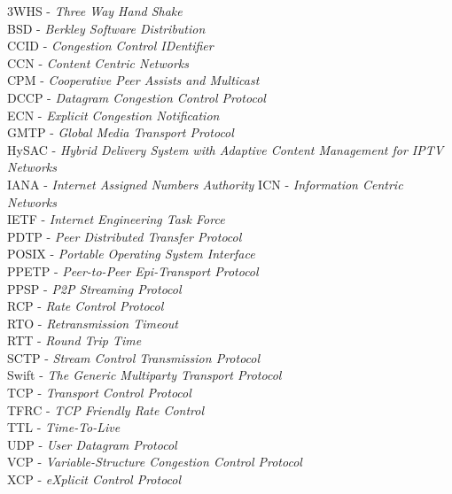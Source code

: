 3WHS		- \textit{Three Way Hand Shake}\\
BSD		- \textit{Berkley Software Distribution}\\
CCID		- \textit{Congestion Control IDentifier}\\
CCN		- \textit{Content Centric Networks}\\
CPM		- \textit{Cooperative Peer Assists and Multicast}\\
DCCP		- \textit{Datagram Congestion Control Protocol}\\
ECN		- \textit{Explicit Congestion Notification}\\
GMTP		- \textit{Global Media Transport Protocol}\\
HySAC		- \textit{Hybrid Delivery System with Adaptive Content Management
for IPTV Networks}\\
IANA		- \textit{Internet Assigned Numbers Authority}
ICN		- \textit{Information Centric Networks}\\
IETF		- \textit{Internet Engineering Task Force}\\
PDTP		- \textit{Peer Distributed Transfer Protocol}\\
POSIX		- \textit{Portable Operating System Interface}\\
PPETP		- \textit{Peer-to-Peer Epi-Transport Protocol}\\
PPSP		- \textit{P2P Streaming Protocol}\\
RCP		- \textit{Rate Control Protocol}\\
RTO		- \textit{Retransmission Timeout}\\
RTT		- \textit{Round Trip Time}\\
SCTP		- \textit{Stream Control Transmission Protocol}\\
Swift		- \textit{The Generic Multiparty Transport Protocol}\\
TCP		- \textit{Transport Control Protocol}\\
TFRC		- \textit{TCP Friendly Rate Control}\\
TTL		- \textit{Time-To-Live}\\
UDP		- \textit{User Datagram Protocol}\\
VCP		- \textit{Variable-Structure Congestion Control Protocol}\\
XCP		- \textit{eXplicit Control Protocol}\\